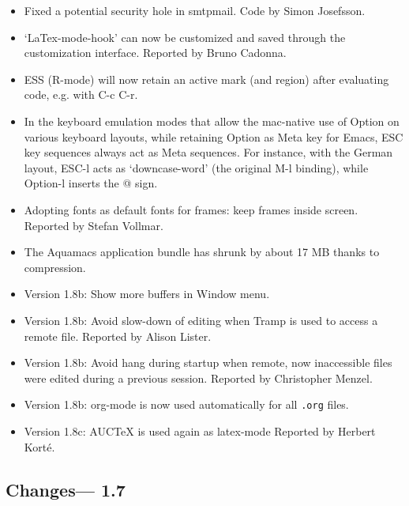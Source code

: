 \begin{itemize}
\item Fixed a potential security hole in smtpmail.
Code by Simon Josefsson.

\item `LaTex-mode-hook' can now be customized and saved through the
  customization interface.
Reported by Bruno Cadonna.

\item ESS (R-mode) will now retain an active mark (and region) after evaluating code, e.g. with C-c C-r.

\item In the keyboard emulation modes that allow the mac-native use of Option on various keyboard layouts, while retaining Option as Meta key for Emacs, ESC key sequences always act as Meta sequences.  For instance, with the German layout, ESC-l  acts as `downcase-word' (the original M-l binding), while Option-l inserts the @ sign.

\item Adopting fonts as default fonts for frames: keep frames inside screen.
Reported by Stefan Vollmar.

\item The Aquamacs application bundle has shrunk by about 17 MB thanks to compression.

\item Version 1.8b: Show more buffers in Window menu.

\item Version 1.8b: Avoid slow-down of editing when Tramp is used to access a remote file.
Reported by Alison Lister.

\item Version 1.8b: Avoid hang during startup when remote, now inaccessible files were edited during a previous session.
Reported by Christopher Menzel.

\item Version 1.8b: org-mode is now used automatically for all {\tt .org} files.

\item Version 1.8c: AUCTeX is used again as latex-mode
Reported by Herbert Korté.
\end{itemize}


\subsection{Changes--- 1.7}

